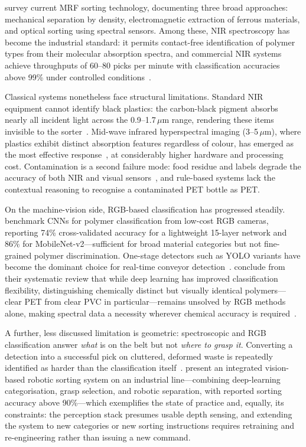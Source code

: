 \citet{lubongo2024} survey current MRF sorting technology, documenting three broad approaches: mechanical separation by density, electromagnetic extraction of ferrous materials, and optical sorting using spectral sensors. Among these, NIR spectroscopy has become the industrial standard: it permits contact-free identification of polymer types from their molecular absorption spectra, and commercial NIR systems achieve throughputs of 60--80 picks per minute with classification accuracies above 99\% under controlled conditions~\citep{lubongo2024}.

Classical systems nonetheless face structural limitations. Standard NIR equipment cannot identify black plastics: the carbon-black pigment absorbs nearly all incident light across the 0.9--1.7\,$\mu$m range, rendering these items invisible to the sorter~\citep{kroell2022}. Mid-wave infrared hyperspectral imaging (3--5\,$\mu$m), where plastics exhibit distinct absorption features regardless of colour, has emerged as the most effective response~\citep{kroell2022}, at considerably higher hardware and processing cost. Contamination is a second failure mode: food residue and labels degrade the accuracy of both NIR and visual sensors~\citep{kroell2022, ramos2024}, and rule-based systems lack the contextual reasoning to recognise a contaminated PET bottle as PET.

On the machine-vision side, RGB-based classification has progressed steadily. \citet{bobulski2021} benchmark CNNs for polymer classification from low-cost RGB cameras, reporting 74\% cross-validated accuracy for a lightweight 15-layer network and 86\% for MobileNet-v2---sufficient for broad material categories but not fine-grained polymer discrimination. One-stage detectors such as YOLO variants have become the dominant choice for real-time conveyor detection~\citep{wu2023}. \citet{kroell2022} conclude from their systematic review that while deep learning has improved classification flexibility, distinguishing chemically distinct but visually identical polymers---clear PET from clear PVC in particular---remains unsolved by RGB methods alone, making spectral data a necessity wherever chemical accuracy is required~\citep{lubongo2024, yang2022}.

A further, less discussed limitation is geometric: spectroscopic and RGB classification answer \emph{what} is on the belt but not \emph{where to grasp it}. Converting a detection into a successful pick on cluttered, deformed waste is repeatedly identified as harder than the classification itself~\citep{lubongo2024}. \citet{koskinopoulou2021} present an integrated vision-based robotic sorting system on an industrial line---combining deep-learning categorisation, grasp selection, and robotic separation, with reported sorting accuracy above 90\%---which exemplifies the state of practice and, equally, its constraints: the perception stack presumes usable depth sensing, and extending the system to new categories or new sorting instructions requires retraining and re-engineering rather than issuing a new command.

